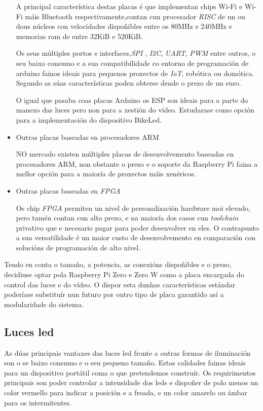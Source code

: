 \begin{itemize}
A principal característica destas placas é que implementan chips Wi-Fi e Wi-Fi máis Bluetooth respectivamente,contan cun procesador \emph{RISC} de un ou dous núcleos con velocidades dispoñibles entre os 80MHz e 240MHz e memorias ram de entre 32KiB e 520KiB.

Os seus múltiples portos e interfaces,\emph{SPI} ,  \emph{I2C}, \emph{UART}, \emph{PWM} entre outros, o seu baixo consumo e a sua compatibilidade co entorno de programación de arduino fainos ideais para pequenos proxectos de \emph{IoT}, robótica ou domótica. Segundo as súas características poden obterse dende o prezo de un euro.

O igual que pasaba coas placas Arduino os ESP son ideais para a parte do manexo das luces pero non para a xestión do vídeo. Estudarase como opción para a implementación do dispositivo BikeLed.
    \item Outras placas baseadas en procesadores ARM

NO mercado existen múltiples placas de desenvolvemento baseadas en procesadores ARM, non obstante o prezo e o soporte da Raspberry Pi faina a mellor opción para a maioría de proxectos máis xenéricos.
    \item Outras placas baseadas en \emph{FPGA}

Os chip \emph{FPGA} permiten un nivel de personalización hardware moi elevado, pero tamén contan cun alto prezo, e na maioría dos casos cun \emph{toolchain} privativo que e necesario pagar para poder desenvolver en eles. O contrapunto a sua versatilidade é un maior custo de desenvolvemento en comparación con solucións de programación de alto nivel.
\end{itemize}
Tendo en conta o tamaño, a potencia, as conexións dispoñibles e o prezo, decidiuse optar pola Raspberry Pi Zero e Zero W como a placa encargada do control das luces e do vídeo. O dispor esta dunhas características estándar poderíase substituír nun futuro por outro tipo de placa garantido así a modularidade do sistema.

\subsection{Luces led}
As dúas principais vantaxes das luces led fronte a outras formas de iluminación son o se baixo consumo e o seu pequeno tamaño. Estas calidades fainas ideais para un dispositivo portátil coma o que pretendemos construír.
Os requirimentos principais son poder controlar a intensidade dos leds e dispoñer de polo menos un color vermello para indicar a posición e a freada, e un color amarelo ou ámbar para os intermitentes.

